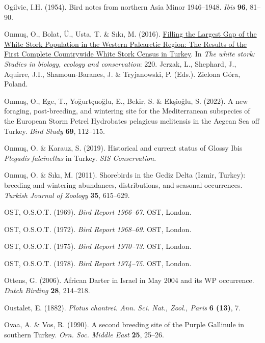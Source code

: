 \documentclass[
  a4paper,
  DIV=11,
  numbers=noendperiod]{scrreprt}
\newlength{\cslhangindent}
\newenvironment{CSLReferences}[2] %
 {\begin{list}{}{%
  \setlength{\itemindent}{0pt}
  \setlength{\leftmargin}{0pt}
  \setlength{\parsep}{0pt}
  \ifodd #1
   \setlength{\leftmargin}{\cslhangindent}
   \setlength{\itemindent}{-1\cslhangindent}
  \fi
  \setlength{\itemsep}{#2\baselineskip}}}
 {\end{list}}
\begin{document}
\begin{CSLReferences}{1}{1}
Ogilvie, I.H. (1954). {Bird notes from northern Asia Minor 1946--1948}.
\emph{Ibis} \textbf{96}, 81--90.

Onmuş, O., Bolat, Ü., Usta, T. \& Sıkı, M. (2016).
\href{https://doi.org/10.13140/2.1.3377.6001}{{Filling the Largest Gap
of the White Stork Population in the Western Palearctic Region: The
Results of the First Complete Countrywide White Stork Census in
Turkey}}. In \emph{The white stork: Studies in biology, ecology and
conservation}: 220. Jerzak, L., Shephard, J., Aquirre, J.I.,
Shamoun-Baranes, J. \& Tryjanowski, P. (Eds.). Zielona Góra, Poland.

Onmuş, O., Ege, T., Yoğurtçuoğlu, E., Bekir, S. \& Ekşioğlu, S. (2022).
{A new foraging, post-breeding, and wintering site for the Mediterranean
subspecies of the European Storm Petrel Hydrobates pelagicus melitensis
in the Aegean Sea off Turkey}. \emph{Bird Study} \textbf{69}, 112--115.

Onmuş, O. \& Karauz, S. (2019). {Historical and current status of Glossy
Ibis \emph{Plegadis falcinellus} in Turkey}. \emph{SIS Conservation}.

Onmuş, O. \& Sıkı, M. (2011). {Shorebirds in the Gediz Delta (Izmir,
Turkey): breeding and wintering abundances, distributions, and seasonal
occurrences}. \emph{Turkish Journal of Zoology} \textbf{35}, 615--629.

OST, O.S.O.T. (1969). \emph{{Bird Report 1966--67}}. OST, London.

OST, O.S.O.T. (1972). \emph{{Bird Report 1968--69}}. OST, London.

OST, O.S.O.T. (1975). \emph{{Bird Report 1970--73}}. OST, London.

OST, O.S.O.T. (1978). \emph{{Bird Report 1974--75}}. OST, London.

Ottens, G. (2006). {African Darter in Israel in May 2004 and its WP
occurrence}. \emph{Dutch Birding} \textbf{28}, 214--218.

Oustalet, E. (1882). {\emph{Plotus chantrei.}} \emph{Ann. Sci. Nat.,
Zool., Paris} \textbf{6 (13)}, 7.

Ovaa, A. \& Vos, R. (1990). {A second breeding site of the Purple
Gallinule in southern Turkey}. \emph{Orn. Soc. Middle East} \textbf{25},
25--26.


\end{CSLReferences}
\end{document}

